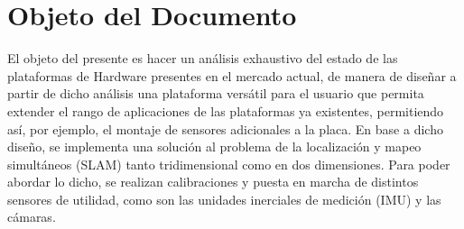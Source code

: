 \section*{Objeto del Documento}
\label{sec:0_objeto}
El objeto del presente es hacer un análisis exhaustivo del estado de las plataformas de Hardware presentes en el mercado actual, de manera de diseñar a partir de dicho análisis una plataforma versátil para el usuario que permita extender el rango de aplicaciones de las plataformas ya existentes, permitiendo así, por ejemplo, el montaje de sensores adicionales a la placa. En base a dicho diseño, se implementa una solución al problema de la localización y mapeo simultáneos (SLAM) tanto tridimensional como en dos dimensiones. Para poder abordar lo dicho, se realizan calibraciones y puesta en marcha de distintos sensores de utilidad, como son las unidades inerciales de medición (IMU) y las cámaras.